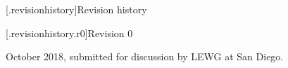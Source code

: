 [\ioaudio.revisionhistory]{Revision history}

[\ioaudio.revisionhistory.r0]{Revision 0}

\pnum
October 2018, submitted for discussion by LEWG at San Diego.